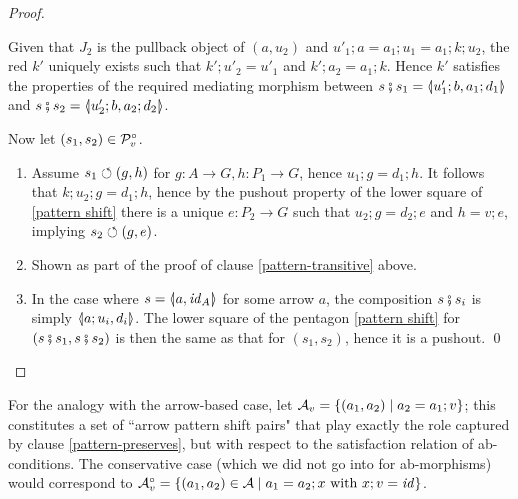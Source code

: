 \begin{fullorname}
\begin{proof}
\begin{enumerate}[topsep=\smallskipamount]
\begin{center}
\end{center}
%
Given that $J_2$ is the pullback object of $(a,u_2)$ and $u'_1;a=a_1;u_1=a_1;k;u_2$, the red $k'$ uniquely exists such that $k';u'_2=u'_1$ and $k';a_2=a_1;k$. Hence $k'$ satisfies the properties of the required mediating morphism between $s\spcomp s_1=\spanof{u'_1;b}{a_1;d_1}$ and $s\spcomp s_2=\spanof{u'_2;b}{a_2;d_2}$.
\end{enumerate}
%
Now let $(s_1,s_2)\in \mathcal{P}^\circ_v$.
%
\begin{enumerate}[resume,topsep=\smallskipamount]
\item Assume $s_1\circlearrowleft (g,h)$ for $g:A\to G,h:P_1\to G$, hence $u_1;g=d_1;h$. It follows that $k;u_2;g=d_1;h$, hence by the pushout property of the lower square of \eqref{pattern shift} there is a unique $e:P_2\to G$ such that $u_2;g=d_2;e$ and $h=v;e$, implying $s_2\circlearrowleft (g,e)$.

\item Shown as part of the proof of clause \ref{pattern-transitive} above.

\item In the case where $s=\spanof{a}{\id_A}$ for some arrow $a$, the composition $s \fatsemi s_i$ is simply $\spanof{a;u_i}{d_i}$. The lower square of the pentagon \eqref{pattern shift} for $(s\fatsemi s_1,s\fatsemi s_2)$ is then the same as that for $(s_1,s_2)$, hence it is a pushout.
\qed
\end{enumerate}
\end{proof}
\end{fullorname}
%
For the analogy with the arrow-based case, let $\mathcal{A}_v=\{{(a_1,a_2)\mid a_2=a_1;v}\}$; this constitutes a set of ``arrow pattern shift pairs" that play exactly the role captured by clause \ref{pattern-preserves}, but with respect to the satisfaction relation of ab-conditions. The conservative case (which we did not go into for ab-morphisms) would correspond to $\mathcal{A}^\circ_v=\{{(a_1,a_2)\in \mathcal{A}\mid a_1=a_2;x \text{ with } x;v=\mathit{id}}\}$.

